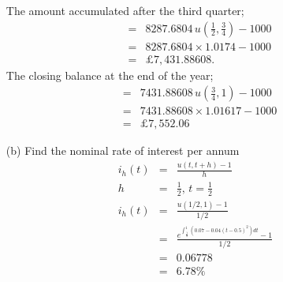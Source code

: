 \documentclass[12pt,a4paper]{article}
\begin{document}
\begin{enumerate}
The amount accumulated after the third quarter;
\begin{eqnarray*}
&=&8287.6804\, u\left(\frac{1}{2},\frac{3}{4} \right)-1000\\
&=& 8287.6804\times 1.0174-1000\\
&=& \pounds 7,431.88608.
\end{eqnarray*}
The closing balance at the end of the year;
\begin{eqnarray*}
&=& 7431.88608\, u\left(\frac{3}{4},1 \right)-1000\\
&=& 7431.88608\times 1.01617-1000\\
&=& \pounds 7,552.06
\end{eqnarray*}
\item[(b)]
Find the nominal rate of interest per annum
\begin{eqnarray*}
i_h(t)&=&\frac{u(t,t+h)-1}{h}\\
h&=&\frac{1}{2}, \,
t=\frac{1}{2}\\
i_h(t)&=& \frac{u(1/2,1)-1}{1/2}\\
&=& \frac{e^{\int_{\frac{1}{2}} ^{1}(0.07-0.04(t-0.5)^2 )dt}-1}{1/2}\\
&=& 0.06778\\
&=& 6.78 \%
\end{eqnarray*}
\end{enumerate}
\end{document}
